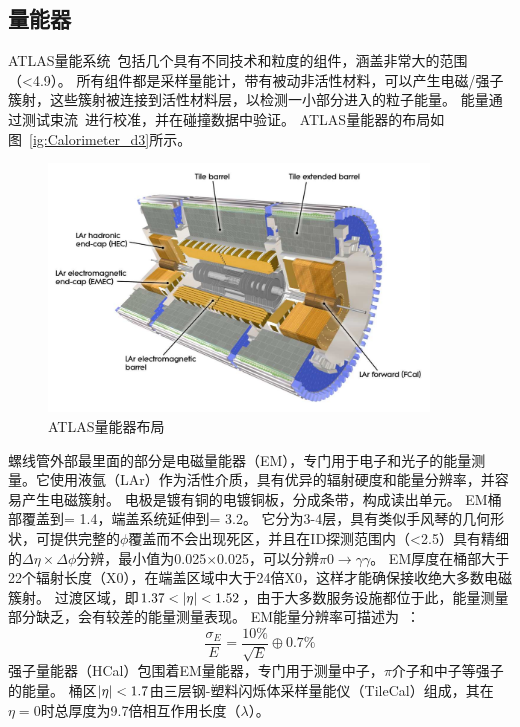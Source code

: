 \subsection{量能器}
ATLAS量能系统~\cite{ATLAS_Collaboration_2008}包括几个具有不同技术和粒度的组件，涵盖非常大的范围（\abseta <4.9）。 所有组件都是采样量能计，带有被动非活性材料，可以产生电磁/强子簇射，这些簇射被连接到活性材料层，以检测一小部分进入的粒子能量。 能量通过测试束流~\cite{4436305,Davidek_2009}进行校准，并在碰撞数据中验证。 ATLAS量能器的布局如图~\ref{ig:Calorimeter_d3}所示。
\begin{figure}[h]
\begin{center}
\includegraphics[width=0.9\textwidth]{fig/Calorimeter_d3.pdf}
\caption{ATLAS量能器布局} \label{fig:Calorimeter_d3}
\end{center}
\end{figure}
螺线管外部最里面的部分是电磁量能器（EM），专门用于电子和光子的能量测量。它使用液氩（LAr）作为活性介质，具有优异的辐射硬度和能量分辨率，并容易产生电磁簇射。
电极是镀有铜的电镀铜板，分成条带，构成读出单元。 EM桶部覆盖到\abseta = 1.4，端盖系统延伸到\abseta = 3.2。 它分为3-4层，具有类似手风琴的几何形状，可提供完整的$\phi$覆盖而不会出现死区，并且在ID探测范围内（\abseta <2.5）具有精细的$\Delta \eta\times\Delta\phi$分辨，最小值为0.025$\times$0.025，可以分辨$\pi0\rightarrow \gamma\gamma$。
EM厚度在桶部大于22个辐射长度（X0），在端盖区域中大于24倍X0，这样才能确保接收绝大多数电磁簇射。 过渡区域，即$1.37<\abseta<1.52$，由于大多数服务设施都位于此，能量测量部分缺乏，会有较差的能量测量表现。 EM能量分辨率可描述为~\cite{ATLAS_Collaboration_2008}：
\begin{equation}
\frac{\sigma_{E}}{E}=\frac{10\%}{\sqrt{E}}\oplus0.7\%
\end{equation}
强子量能器（HCal）包围着EM量能器，专门用于测量中子，$\pi$介子和中子等强子的能量。 桶区$|\eta|<1.7$由三层钢-塑料闪烁体采样量能仪（TileCal）组成，其在$\eta = 0$时总厚度为9.7倍相互作用长度（$\lambda$）。
